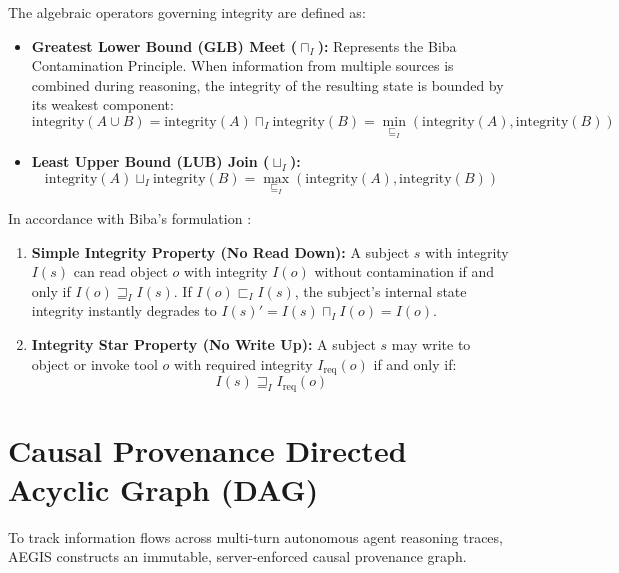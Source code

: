 The algebraic operators governing integrity are defined as:
\begin{itemize}
    \item \textbf{Greatest Lower Bound (GLB) Meet ($\sqcap_I$):} Represents the Biba Contamination Principle. When information from multiple sources is combined during reasoning, the integrity of the resulting state is bounded by its weakest component:
    \begin{equation}
    \text{integrity}(A \cup B) = \text{integrity}(A) \sqcap_I \text{integrity}(B) = \min_{\sqsubseteq_I}(\text{integrity}(A), \text{integrity}(B))
    \end{equation}
    \item \textbf{Least Upper Bound (LUB) Join ($\sqcup_I$):}
    \begin{equation}
    \text{integrity}(A) \sqcup_I \text{integrity}(B) = \max_{\sqsubseteq_I}(\text{integrity}(A), \text{integrity}(B))
    \end{equation}
\end{itemize}

\begin{axiom}
In accordance with Biba's formulation \cite{biba1977integrity}:
\begin{enumerate}
    \item \textbf{Simple Integrity Property (No Read Down):} A subject $s$ with integrity $I(s)$ can read object $o$ with integrity $I(o)$ without contamination if and only if $I(o) \sqsupseteq_I I(s)$. If $I(o) \sqsubset_I I(s)$, the subject's internal state integrity instantly degrades to $I(s)' = I(s) \sqcap_I I(o) = I(o)$.
    \item \textbf{Integrity Star Property (No Write Up):} A subject $s$ may write to object or invoke tool $o$ with required integrity $I_{\text{req}}(o)$ if and only if:
    \begin{equation}
    I(s) \sqsupseteq_I I_{\text{req}}(o)
    \end{equation}
\end{enumerate}
\end{axiom}

\section{Causal Provenance Directed Acyclic Graph (DAG)}
To track information flows across multi-turn autonomous agent reasoning traces, AEGIS constructs an immutable, server-enforced causal provenance graph.

